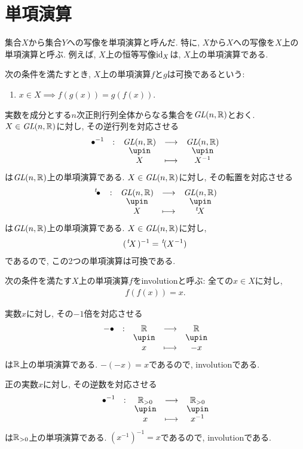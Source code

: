 \section{単項演算}
集合$X$から集合$Y$への写像を単項演算と呼んだ.
特に, $X$から$X$への写像を$X$上の単項演算と呼ぶ.
例えば, $X$上の恒等写像$\operatorname{id}_X$は, $X$上の単項演算である.
\begin{definition}
  次の条件を満たすとき,
  $X$上の単項演算$f$と$g$は可換であるという:
  \begin{enumerate}
  \item $x\in X \implies f(g(x))=g(f(x))$.
  \end{enumerate}
\end{definition}
\begin{example}
  実数を成分とする$n$次正則行列全体からなる集合を$\textit{GL}(n,\mathbb{R})$とおく.
  $X\in \textit{GL}(n,\mathbb{R})$に対し, その逆行列を対応させる
  \begin{align*}
    \shazo{\tofu^{-1}}
          {\GL(n,\RR)}{\GL(n,\RR)}
          {X}{X^{-1}}
  \end{align*}
  は$\textit{GL}(n,\mathbb{R})$上の単項演算である.
  $X\in \textit{GL}(n,\mathbb{R})$に対し, その転置を対応させる
  \begin{align*}
    \shazo{\transposed{\tofu}}
          {\GL(n,\RR)}{\GL(n,\RR)}
          {X}{\transposed{X}}
  \end{align*}
  は$\textit{GL}(n,\mathbb{R})$上の単項演算である.
  $X\in \textit{GL}(n,\mathbb{R})$に対し,
  \begin{align*}
    (\left.^{t}\!X\right.)^{-1}=\left.^{t}\!(X^{-1})\right.
  \end{align*}
  であるので, この2つの単項演算は可換である.
\end{example}
\begin{definition}
  次の条件を満たす$X$上の単項演算$f$をinvolutionと呼ぶ:
  全ての$x\in X$に対し,
  \begin{align*}
    f(f(x))=x.
  \end{align*}
\end{definition}
\begin{example}
  実数$x$に対し, その$-1$倍を対応させる
  \begin{align*}
    \shazo{-\tofu}
          {\RR}{\RR}
          {x}{-x}
  \end{align*}
  は$\mathbb{R}$上の単項演算である.
  $-(-x)=x$であるので,
  involutionである.
\end{example}
\begin{example}
  正の実数$x$に対し, その逆数を対応させる
  \begin{align*}
    \shazo{\tofu^{-1}}
          {\RR_{>0}}{\RR_{>0}}
          {x}{x^{-1}}
  \end{align*}
  は$\mathbb{R}_{>0}$上の単項演算である.
  $(x^{-1})^{-1}=x$であるので,
  involutionである.
\end{example}
